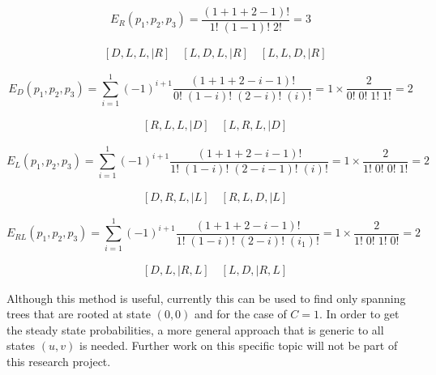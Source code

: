 \begin{equation*}
    E_R(p_1, p_2, p_3) = \frac{(1+1+2-1)!}{1! \; (1-1)! \; 2!} = 3
\end{equation*}

\begin{align*}
    & [D, L, L, | R] \quad [L, D, L, | R] \quad [L, L, D, | R]
\end{align*}


\begin{equation*}
    E_D(p_1, p_2, p_3) = \sum_{i=1}^{1} (-1)^{i+1} \frac{(1+1+2-i-1)!}{0! \;
    (1-i)! \; (2-i)! \; (i)!} = 1 \times \frac{2}{0! \; 0! \; 1! \; 1!} = 2
\end{equation*}

\begin{align*}
    & [R, L, L, | D] \quad [L, R, L, | D]
\end{align*}


\begin{equation*}
    E_L(p_1, p_2, p_3) = \sum_{i=1}^{1} (-1)^{i+1}
    \frac{(1+1+2-i-1)!}{1! \; (1-i)! \; (2-i-1)! \; (i)!}
    = 1 \times \frac{2}{1! \; 0! \; 0! \; 1!} = 2
\end{equation*}

\begin{align*}
    & [D, R, L, | L] \quad [R, L, D, | L]
\end{align*}


\begin{equation*}
    E_{RL}(p_1, p_2, p_3) = \sum_{i=1}^{1} (-1)^{i+1}
    \frac{(1+1+2-i-1)!}{1! \; (1-i)! \; (2-i)! \; (i_1)!}
    = 1 \times \frac{2}{1! \; 0! \; 1! \; 0!} = 2
\end{equation*}

\begin{align*}
    & [D, L, | R, L] \quad [L, D, | R, L]
\end{align*}


Although this method is useful, currently this can be used to find only spanning
trees that are rooted at state \((0,0)\) and for the case of \(C = 1\).
In order to get the steady state probabilities, a more general approach that is
generic to all states \((u,v)\) is needed.
Further work on this specific topic will not be part of this research project.
